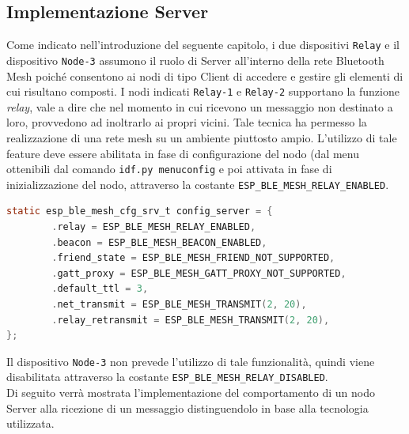 \subsection{Implementazione Server}
\label{sub:implementazione server}
Come indicato nell'introduzione del seguente capitolo, i due dispositivi \texttt{Relay} e il dispositivo \texttt{Node-3} assumono il ruolo di Server all'interno della rete Bluetooth Mesh poiché consentono ai nodi di tipo Client  di accedere e gestire gli elementi di cui risultano composti. 
I nodi indicati \texttt{Relay-1} e \texttt{Relay-2} supportano la funzione \textit{relay}, vale a dire che nel momento in cui ricevono un messaggio non destinato a loro, provvedono ad inoltrarlo ai propri vicini. Tale tecnica ha permesso la realizzazione di una rete mesh su un ambiente piuttosto ampio. L'utilizzo di tale feature deve essere abilitata in fase di configurazione del nodo (dal menu ottenibili dal comando \texttt{idf.py menuconfig} e poi attivata in fase di inizializzazione del nodo, attraverso la costante \texttt{ESP\_BLE\_MESH\_RELAY\_ENABLED}.

\begin{lstlisting}[language=C, caption= attivazione feature \textit{relay}]
static esp_ble_mesh_cfg_srv_t config_server = {
        .relay = ESP_BLE_MESH_RELAY_ENABLED,
        .beacon = ESP_BLE_MESH_BEACON_ENABLED,
        .friend_state = ESP_BLE_MESH_FRIEND_NOT_SUPPORTED,
        .gatt_proxy = ESP_BLE_MESH_GATT_PROXY_NOT_SUPPORTED,
        .default_ttl = 3,
        .net_transmit = ESP_BLE_MESH_TRANSMIT(2, 20),
        .relay_retransmit = ESP_BLE_MESH_TRANSMIT(2, 20),
};
\end{lstlisting}

\noindent Il dispositivo \texttt{Node-3} non prevede l'utilizzo di tale funzionalità, quindi viene disabilitata attraverso la costante \texttt{ESP\_BLE\_MESH\_RELAY\_DISABLED}.\\
Di seguito verrà mostrata l'implementazione del comportamento di un nodo Server alla ricezione di un messaggio distinguendolo in base alla tecnologia utilizzata.\\

